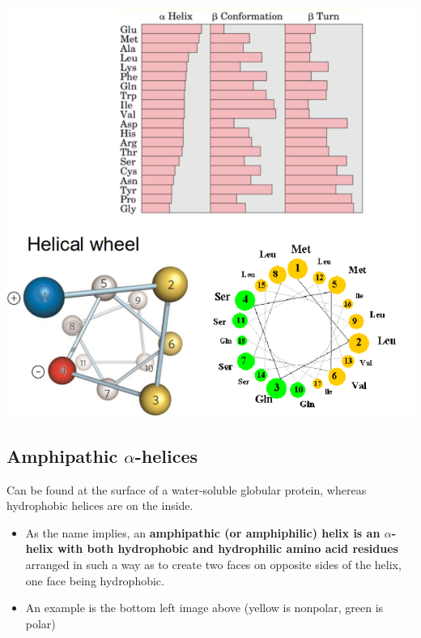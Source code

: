 \documentclass[10pt]{article}
\begin{document}
\begin{center}
    \includegraphics*[scale=0.7]{L2_5.png}
\end{center}
\subsection*{Amphipathic $\alpha$-helices}
Can be found at the surface of a water-soluble globular protein, whereas hydrophobic helices are on the inside.
\begin{itemize}
    \item As the name implies, an \textbf{amphipathic (or amphiphilic) helix is an $\alpha$-helix with both hydrophobic and hydrophilic amino acid residues} arranged in such a way as to create two faces on opposite sides of the helix, one face being hydrophobic.
    \item An example is the bottom left image above (yellow is nonpolar, green is polar)
\end{itemize}
\end{document}
